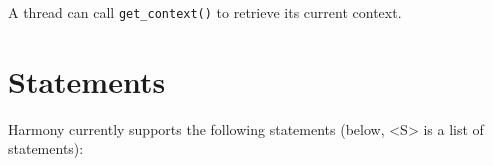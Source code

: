 \documentclass{report}
\begin{document}

A thread can call \texttt{get\_context()} to retrieve its current
context.

\section{Statements}

Harmony currently supports the following statements
(below, <{S}> is a list of statements):
\end{document}
